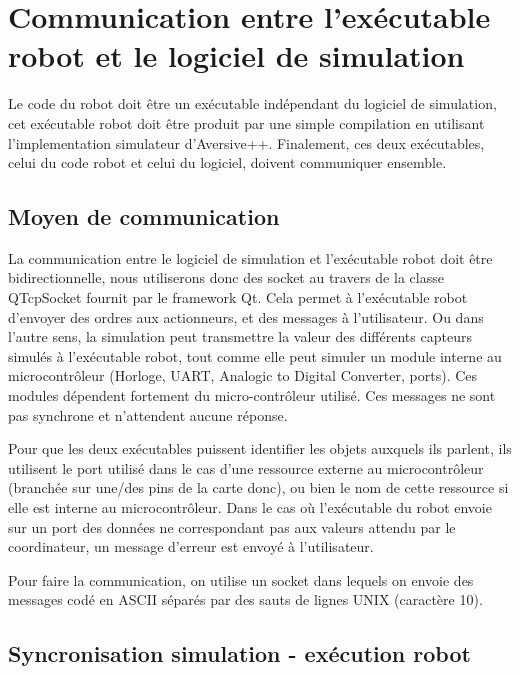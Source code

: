 \section{Communication entre l'exécutable robot et le logiciel de simulation}

Le code du robot doit être un exécutable indépendant du logiciel de simulation, cet exécutable robot doit être produit par une simple compilation en utilisant l'implementation simulateur d'Aversive++. Finalement, ces deux exécutables, celui du code robot et celui du logiciel, doivent communiquer ensemble.

\subsection{Moyen de communication}

La communication entre le logiciel de simulation et l'exécutable robot
doit être bidirectionnelle, nous utiliserons donc des socket au travers de la classe QTcpSocket fournit par le framework Qt.
Cela permet à l'exécutable robot d'envoyer
des ordres aux actionneurs, et des messages à l'utilisateur. Ou dans
l'autre sens, la simulation peut transmettre la valeur des différents
capteurs simulés à l'exécutable robot, tout comme elle peut simuler un module
interne au microcontrôleur (Horloge, UART, Analogic to Digital
Converter, ports). Ces modules dépendent fortement du micro-contrôleur
utilisé. Ces messages ne sont pas synchrone et
n'attendent aucune réponse.

Pour que les deux exécutables puissent identifier les objets auxquels
ils parlent, ils utilisent le port utilisé dans le cas d'une ressource
externe au microcontrôleur (branchée sur une/des pins de la carte donc), ou bien le nom de cette ressource si elle est interne au microcontrôleur. %
Dans le cas où l'exécutable du robot envoie sur un port des
données ne correspondant pas aux valeurs attendu par le coordinateur,
un message d'erreur est envoyé à l'utilisateur.


Pour faire la communication, on utilise un socket dans lequels on envoie des messages codé en ASCII séparés par des sauts de lignes UNIX (caractère 10).
\subsection{Syncronisation simulation - exécution robot}

